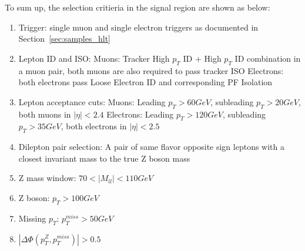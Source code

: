 \vspace{0.3cm}
To sum up, the selection critieria in the signal region are shown as below:
\begin{enumerate}
\item Trigger: single muon and single electron triggers as documented in Section~\ref{sec:samples_hlt}
\item Lepton ID and ISO:
  \subitem Muons: Tracker High $p_T$ ID $+$ High $p_T$ ID combination in a muon pair, 
  both muons are also required to pass tracker ISO
  \subitem Electrons: both electrons pass Loose Electron ID and corresponding PF Isolation
\item Lepton acceptance cuts:
  \subitem Muons: Leading  $p_T > 60 GeV$, subleading $p_T > 20 GeV$, both muons in $|\eta| < 2.4$
  \subitem Electrons: Leading $p_T >120 GeV$, subleading $p_T >35 GeV$, both electrons in $|\eta|<2.5$
\item Dilepton pair selection: A pair of same flavor opposite sign
  leptons with a closest invariant mass to the true Z boson mass
\item Z mass window:   $70 < |M_{ll}| < 110 GeV$
\item Z boson: $p_T >100 GeV$
\item Missing $p_T$: $p_T ^{miss} > 50GeV$
\item $|\Delta \Phi (p_T ^Z ,p_T ^{miss})|>0.5$
\end{enumerate}


